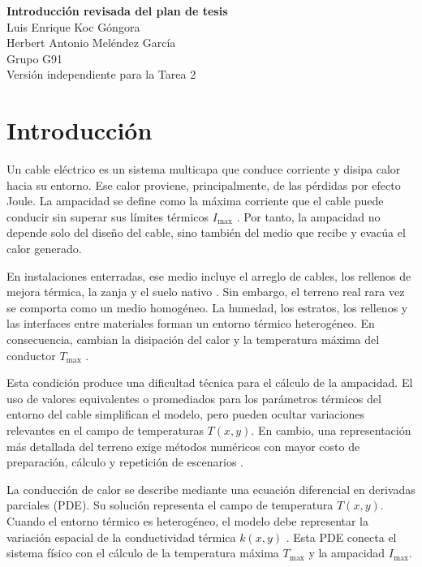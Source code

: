 \documentclass[11pt]{article}
\newcommand{\Tmax}{T_{\max}}
\newcommand{\Imax}{I_{\max}}
\newcommand{\kx}{k(x,y)}
\begin{document}
\begin{center}
{\Large \textbf{Introducción revisada del plan de tesis}}\\[0.25em]
{\normalsize Luis Enrique Koc Góngora}\\
{\normalsize Herbert Antonio Meléndez García}\\
{\normalsize Grupo G91}\\[0.25em]
{\large Versión independiente para la Tarea 2}
\end{center}

\section*{Introducción}

Un cable eléctrico es un sistema multicapa que conduce corriente y disipa calor hacia su entorno. Ese calor proviene, principalmente, de las pérdidas por efecto Joule. La ampacidad se define como la máxima corriente que el cable puede conducir sin superar sus límites térmicos \(\Imax\) \parencites[752--756]{neher1957}[3--5]{enescu2020}. Por tanto, la ampacidad no depende solo del diseño del cable, sino también del medio que recibe y evacúa el calor generado.

En instalaciones enterradas, ese medio incluye el arreglo de cables, los rellenos de mejora térmica, la zanja y el suelo nativo \parencites[3--6]{enescu2021}{ieee442}[1,10]{kim2025}. Sin embargo, el terreno real rara vez se comporta como un medio homogéneo. La humedad, los estratos, los rellenos y las interfaces entre materiales forman un entorno térmico heterogéneo. En consecuencia, cambian la disipación del calor y la temperatura máxima del conductor \(\Tmax\) \parencites[4--6]{enescu2021}[1,6--7]{khumalo2025}[1--3]{aldulaimi2024}.

Esta condición produce una dificultad técnica para el cálculo de la ampacidad. El uso de valores equivalentes o promediados para los parámetros térmicos del entorno del cable simplifican el modelo, pero pueden ocultar variaciones relevantes en el campo de temperaturas \(T(x,y)\). En cambio, una representación más detallada del terreno exige métodos numéricos con mayor costo de preparación, cálculo y repetición de escenarios \parencites[41--42,93--99]{cigre2025}[1--3,12]{aldulaimi2024}.

La conducción de calor se describe mediante una ecuación diferencial en derivadas parciales (PDE). Su solución representa el campo de temperatura \(T(x,y)\). Cuando el entorno térmico es heterogéneo, el modelo debe representar la variación espacial de la conductividad térmica \(\kx\) \parencites[3--4]{enescu2021}[3]{xing2023}. Esta PDE conecta el sistema físico con el cálculo de la temperatura máxima \(\Tmax\) y la ampacidad \(\Imax\).
\end{document}
